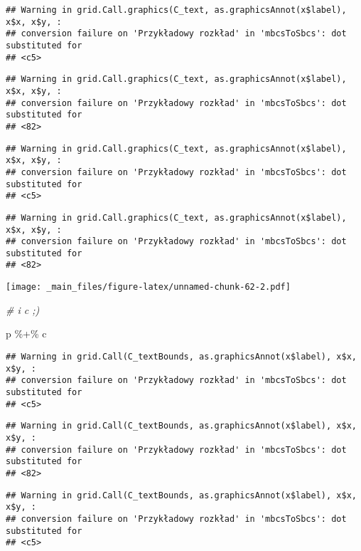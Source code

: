 \documentclass[
]{book}
\newenvironment{Shaded}{\begin{snugshade}}{\end{snugshade}}
\newcommand{\CommentTok}[1]{\textcolor[rgb]{0.56,0.35,0.01}{\textit{#1}}}
\newcommand{\NormalTok}[1]{#1}
\newcommand{\SpecialCharTok}[1]{\textcolor[rgb]{0.00,0.00,0.00}{#1}}
\begin{document}
\begin{verbatim}
## Warning in grid.Call.graphics(C_text, as.graphicsAnnot(x$label), x$x, x$y, :
## conversion failure on 'Przykładowy rozkład' in 'mbcsToSbcs': dot substituted for
## <c5>
\end{verbatim}

\begin{verbatim}
## Warning in grid.Call.graphics(C_text, as.graphicsAnnot(x$label), x$x, x$y, :
## conversion failure on 'Przykładowy rozkład' in 'mbcsToSbcs': dot substituted for
## <82>
\end{verbatim}

\begin{verbatim}
## Warning in grid.Call.graphics(C_text, as.graphicsAnnot(x$label), x$x, x$y, :
## conversion failure on 'Przykładowy rozkład' in 'mbcsToSbcs': dot substituted for
## <c5>
\end{verbatim}

\begin{verbatim}
## Warning in grid.Call.graphics(C_text, as.graphicsAnnot(x$label), x$x, x$y, :
## conversion failure on 'Przykładowy rozkład' in 'mbcsToSbcs': dot substituted for
## <82>
\end{verbatim}

\texttt{[image: \_main\_files/figure-latex/unnamed-chunk-62-2.pdf]}

\begin{Shaded}
\begin{Highlighting}[]
\CommentTok{\# i c ;)}

\NormalTok{p }\SpecialCharTok{\%+\%}\NormalTok{ c}
\end{Highlighting}
\end{Shaded}

\begin{verbatim}
## Warning in grid.Call(C_textBounds, as.graphicsAnnot(x$label), x$x, x$y, :
## conversion failure on 'Przykładowy rozkład' in 'mbcsToSbcs': dot substituted for
## <c5>
\end{verbatim}

\begin{verbatim}
## Warning in grid.Call(C_textBounds, as.graphicsAnnot(x$label), x$x, x$y, :
## conversion failure on 'Przykładowy rozkład' in 'mbcsToSbcs': dot substituted for
## <82>
\end{verbatim}

\begin{verbatim}
## Warning in grid.Call(C_textBounds, as.graphicsAnnot(x$label), x$x, x$y, :
## conversion failure on 'Przykładowy rozkład' in 'mbcsToSbcs': dot substituted for
## <c5>
\end{verbatim}
\end{document}
